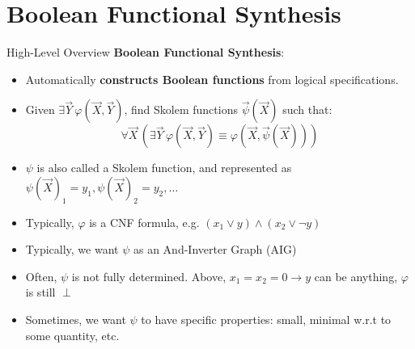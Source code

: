 \documentclass[aspectratio=169]{beamer}
\begin{document}
\section{Boolean Functional Synthesis}
\begin{frame}{High-Level Overview}
  \textbf{Boolean Functional Synthesis}:
  \begin{itemize}
    \item Automatically \textbf{constructs Boolean functions} from logical
        specifications.
    \item Given \(\exists \vec{Y}\, \varphi(\vec{X}, \vec{Y})\),
        find Skolem functions \(\vec{\psi}(\vec{X})\) such that:
        \[
            \forall \vec{X}\, \left( \exists \vec{Y}\, \varphi(\vec{X}, \vec{Y}) \equiv \varphi(\vec{X}, \vec{\psi}(\vec{X})) \right)
        \]
    \item $\psi$ is also called a Skolem function, and represented as
        $\psi(\vec{X})_1 = y_1, \psi(\vec{X})_2 = y_2, \ldots$
    \item Typically, $\varphi$ is a CNF formula, e.g. $(x_1 \lor y) \land (x_2
        \lor \neg y)$
    \item Typically, we want $\psi$ as an And-Inverter Graph (AIG)
    \item Often, $\psi$ is not fully determined. Above, $x_1 = x_2 = 0
        \rightarrow y$ can be anything, $\varphi$ is still $\perp$
    \item Sometimes, we want $\psi$ to have specific properties: small, minimal
        w.r.t to some quantity, etc.
\end{itemize}
\end{frame}
\end{document}
